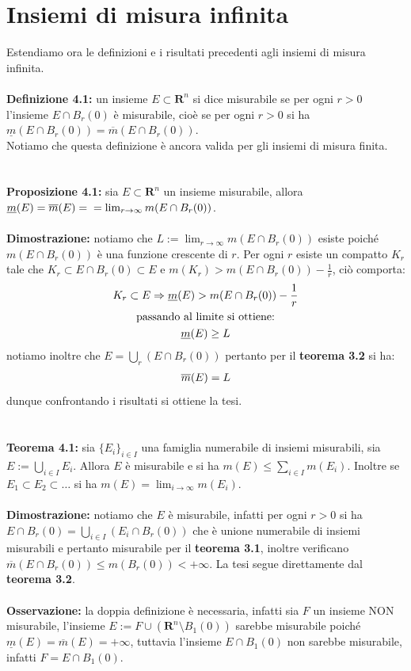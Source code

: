 \documentclass{article}
\begin{document}
\section{Insiemi di misura infinita}
Estendiamo ora le definizioni e i risultati precedenti agli insiemi di misura infinita.\\ \\
\textbf{Definizione 4.1:} un insieme $E \subset \mathbf{R}^n$ si dice misurabile se per ogni $r > 0$ l'insieme $E \cap B_r(0)$ è misurabile, cioè se per ogni $r > 0$ si ha $\underline{m}(E \cap B_r(0)) = \overline{m}(E \cap B_r(0))$. \\
Notiamo che questa definizione è ancora valida per gli insiemi di misura finita. \\ \\ \\
\textbf{Proposizione 4.1:} sia $E \subset \mathbf{R}^n$ un insieme misurabile, allora $\underline{m}(E) = \overline{m}(E) = \\ = \lim_{r \rightarrow \infty} m(E \cap B_r(0))$. \\ \\
\textbf{Dimostrazione:} notiamo che $L := \lim_{r \rightarrow \infty} m(E \cap B_r(0))$ esiste poiché $m(E \cap B_r(0))$ è una funzione crescente di $r$. Per ogni $r$ esiste un compatto $K_r$ tale che $K_r \subset E \cap B_r(0) \subset E$ e $m(K_r) > m(E \cap B_r(0)) - \frac{1}{r}$, ciò comporta:
\begin{gather}
    K_r \subset E \Rightarrow \underline{m}(E) > m(E \cap B_r(0)) - \frac{1}{r} \notag \\
    \text{passando al limite si ottiene:} \notag \\
    \underline{m}(E) \geq L \notag
\end{gather}
notiamo inoltre che $E = \bigcup_r (E \cap B_r(0))$ pertanto per il \textbf{teorema 3.2} si ha:
\begin{gather}
    \overline{m}(E) = L \notag
\end{gather}
dunque confrontando i risultati si ottiene la tesi. \\ \\ \\
\textbf{Teorema 4.1:} sia $\{ E_i \}_{i \in I}$ una famiglia numerabile di insiemi misurabili, sia $E := \bigcup_{i \in I} E_i$. Allora $E$ è misurabile e si ha $m(E) \leq \sum_{i \in I} m(E_i)$. Inoltre se $E_1 \subset E_2 \subset \dots$ si ha $m(E) = \lim_{i \rightarrow \infty} m(E_i)$. \\ \\
\textbf{Dimostrazione:} notiamo che $E$ è misurabile, infatti per ogni $r > 0$ si ha $E \cap B_r(0) = \bigcup_{i \in I} (E_i \cap B_r(0))$ che è unione numerabile di insiemi misurabili e pertanto misurabile per il \textbf{teorema 3.1}, inoltre verificano $\overline{m}(E \cap B_r(0)) \leq m(B_r(0)) < + \infty$. La tesi segue direttamente dal \textbf{teorema 3.2}. \\ \\
\textbf{Osservazione:} la doppia definizione è necessaria, infatti sia $F$ un insieme NON misurabile, l'insieme $E := F \cup (\mathbf{R}^n \setminus B_1(0))$ sarebbe misurabile poiché $\underline{m}(E) = \overline{m}(E) = + \infty$, tuttavia l'insieme $E \cap B_1(0)$ non sarebbe misurabile, infatti $F = E \cap B_1(0)$.
\end{document}
